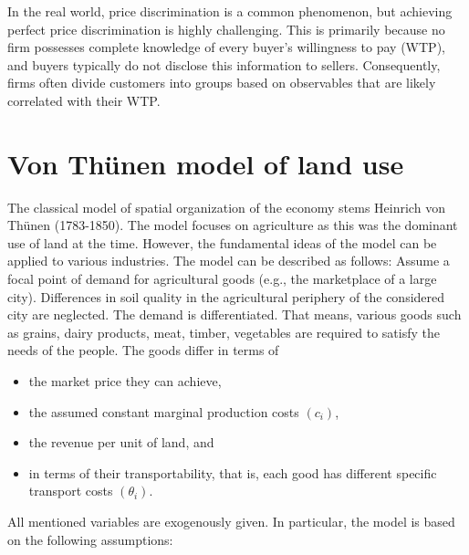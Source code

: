 \documentclass[
  12pt,
  oneside]{book}
\providecommand{\tightlist}{%
  \setlength{\itemsep}{0pt}\setlength{\parskip}{0pt}}
\theoremstyle{definition}
\theoremstyle{definition}
\theoremstyle{definition}
\theoremstyle{definition}
\theoremstyle{remark}
\begin{document}
In the real world, price discrimination is a common phenomenon, but achieving perfect price discrimination is highly challenging. This is primarily because no firm possesses complete knowledge of every buyer's willingness to pay (WTP), and buyers typically do not disclose this information to sellers. Consequently, firms often divide customers into groups based on observables that are likely correlated with their WTP.

\hypertarget{von-thuxfcnen-model-of-land-use}{%
\section{Von Thünen model of land use}\label{von-thuxfcnen-model-of-land-use}}

The classical model of spatial organization of the economy stems Heinrich von Thünen (1783-1850). The model focuses on agriculture as this was the dominant use of land at the time. However, the fundamental ideas of the model can be applied to various industries.
The model can be described as follows: Assume a focal point of demand for agricultural goods (e.g., the marketplace of a large city). Differences in soil quality in the agricultural periphery of the considered city are neglected. The demand is differentiated. That means, various goods such as grains, dairy products, meat, timber, vegetables are required to satisfy the needs of the people. The goods differ in terms of

\begin{itemize}
\tightlist
\item
  the market price they can achieve,
\item
  the assumed constant marginal production costs \((c_i)\),
\item
  the revenue per unit of land, and
\item
  in terms of their transportability, that is, each good has different specific transport costs \((\theta_i)\).
\end{itemize}

All mentioned variables are exogenously given. In particular, the model is based on the following assumptions:
\end{document}
